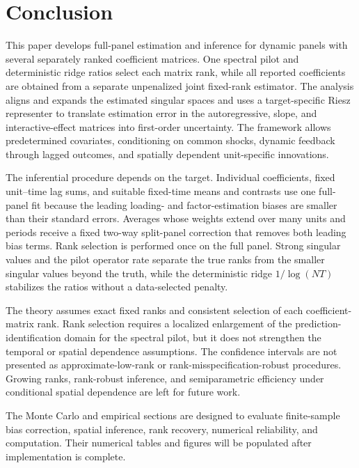 \documentclass[11pt]{article}
\numberwithin{equation}{section}
\theoremstyle{remark}
\begin{document}
\FloatBarrier

\section{Conclusion}
\label{sec:conclusion}

This paper develops full-panel estimation and inference for dynamic panels with several separately ranked coefficient matrices. One spectral pilot and deterministic ridge ratios select each matrix rank, while all reported coefficients are obtained from a separate unpenalized joint fixed-rank estimator. The analysis aligns and expands the estimated singular spaces and uses a target-specific Riesz representer to translate estimation error in the autoregressive, slope, and interactive-effect matrices into first-order uncertainty. The framework allows predetermined covariates, conditioning on common shocks, dynamic feedback through lagged outcomes, and spatially dependent unit-specific innovations.

The inferential procedure depends on the target. Individual coefficients, fixed unit--time lag sums, and suitable fixed-time means and contrasts use one full-panel fit because the leading loading- and factor-estimation biases are smaller than their standard errors. Averages whose weights extend over many units and periods receive a fixed two-way split-panel correction that removes both leading bias terms. Rank selection is performed once on the full panel. Strong singular values and the pilot operator rate separate the true ranks from the smaller singular values beyond the truth, while the deterministic ridge $1/\log(NT)$ stabilizes the ratios without a data-selected penalty.

The theory assumes exact fixed ranks and consistent selection of each coefficient-matrix rank. Rank selection requires a localized enlargement of the prediction-identification domain for the spectral pilot, but it does not strengthen the temporal or spatial dependence assumptions. The confidence intervals are not presented as approximate-low-rank or rank-misspecification-robust procedures. Growing ranks, rank-robust inference, and semiparametric efficiency under conditional spatial dependence are left for future work.

The Monte Carlo and empirical sections are designed to evaluate finite-sample bias correction, spatial inference, rank recovery, numerical reliability, and computation. Their numerical tables and figures will be populated after implementation is complete.
\end{document}

